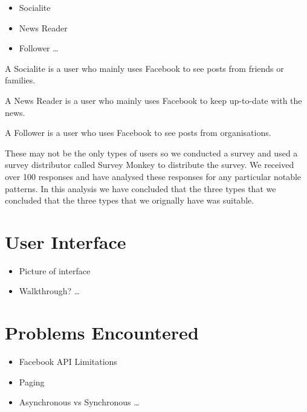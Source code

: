 \begin{itemize}
	\item Socialite
 	\item News Reader
  	\item Follower
\ldots
\end{itemize}

A Socialite is a user who mainly uses Facebook to see posts from friends or families.

A News Reader is a user who mainly uses Facebook to keep up-to-date with the news.

A Follower is a user who uses Facebook to see posts from organisations.

These may not be the only types of users so we conducted a survey and used a survey distributor called Survey Monkey to distribute the survey. We received over 100 responses and have analysed these responses for any particular notable patterns. In this analysis we have concluded that the three types that we concluded that the three types that we orignally have was suitable.

\section{User Interface}

\begin{itemize}
  	\item Picture of interface
  	\item Walkthrough?
\ldots
\end{itemize}

\section{Problems Encountered}

\begin{itemize}
  	\item Facebook API Limitations
	\item Paging
	\item Asynchronous vs Synchronous
\ldots
\end{itemize}



